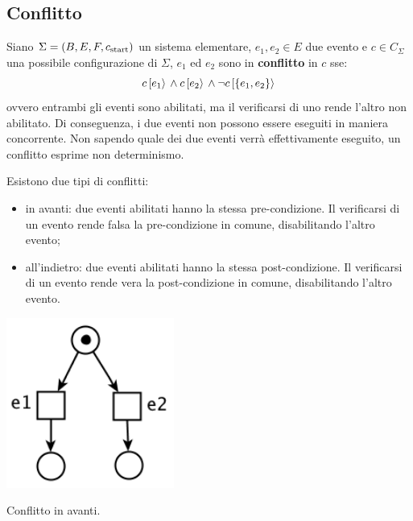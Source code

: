 \subsection*{Conflitto}
\begin{defn}
    Siano $\Sigma = (B, E, F, c_{\textnormal{start}})$ un sistema elementare,
    $e_1, e_2 \in E$ due evento e $c \in C_{\Sigma}$ una possibile
    configurazione di $\Sigma$, $e_1$ ed $e_2$ sono in \textbf{conflitto}
    in $c$ sse:
    \[
        c\,[e_1\rangle\, \land c\,[e_2\rangle\, \land
        \lnot c\,[\left\{e_1, e_2\right\}\rangle\,
    \]
    ovvero entrambi gli eventi sono abilitati, ma il verificarsi di uno rende
    l'altro non abilitato. Di conseguenza, i due eventi non possono essere
    eseguiti in maniera concorrente. Non sapendo quale dei due eventi verrà
    effettivamente eseguito, un conflitto esprime non determinismo.

    Esistono due tipi di conflitti:
    \begin{itemize}
        \item in avanti: due eventi abilitati hanno la stessa pre-condizione.
        Il verificarsi di un evento rende falsa la pre-condizione in comune,
        disabilitando l'altro evento;
        \item all'indietro: due eventi abilitati hanno la stessa
        post-condizione. Il verificarsi di un evento rende vera la
        post-condizione in comune, disabilitando l'altro evento.
    \end{itemize}

    \begin{marginfigure}[-11cm]
        \includegraphics[width=0.75\linewidth]{img/conflitto_avanti.png}
    \caption{Conflitto in avanti.}
    \label{fig:conflitto_avanti}
    \end{marginfigure}


\end{defn}
